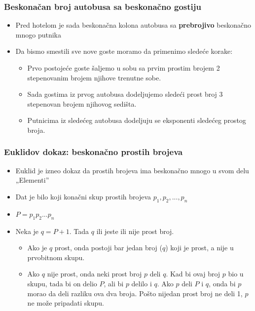 \documentclass{beamer}
\begin{document}
\begin{frame}[fragile]\frametitle{Beskonačan broj autobusa sa beskonačno gostiju}
\begin{itemize}
    \item Pred hotelom je sada beskonačna kolona autobusa sa \textbf{prebrojivo} beskonačno mnogo putnika
    \item Da bismo smestili sve nove goste moramo da primenimo sledeće korake:
    \begin{itemize}
        \item Prvo postojeće goste šaljemo u sobu sa prvim prostim brojem 2 stepenovanim brojem njihove trenutne sobe.
        \item Sada gostima iz prvog autobusa dodeljujemo sledeći prost broj 3 stepenovan brojem njihovog sedišta.
        \item Putnicima iz sledećeg autobusa dodeljuju se eksponenti sledećeg prostog broja.
    \end{itemize}
\end{itemize}
\end{frame}
\begin{frame}[fragile]\frametitle{Euklidov dokaz: beskonačno prostih brojeva}
\begin{itemize}
    \item Euklid je izneo dokaz da prostih brojeva ima beskonačno mnogo u svom delu „Elementi”
    \item Dat je bilo koji konačni skup prostih brojeva $p_{1}, p_{2}, ..., p_{n}$
    \item $P = p_{1}p_{2}...p_{n}$
    \item Neka je $q = P + 1$. Tada $q$ ili jeste ili nije prost broj.
    \begin{itemize}
        \item Ako je $q$ prost, onda postoji bar jedan broj ($q$) koji je prost, a nije u prvobitnom skupu.

                \item Ako $q$ nije prost, onda neki prost broj $p$ deli $q$. Kad bi ovaj broj $p$ bio u skupu, tada bi on delio $P$, ali bi $p$ delilo i $q$. Ako $p$ deli $P$ i $q$, onda bi $p$ morao da deli razliku ova dva broja. Pošto nijedan prost broj ne deli 1, $p$ ne može pripadati skupu.
    \end{itemize}
\end{itemize}
\end{frame}
\end{document}
